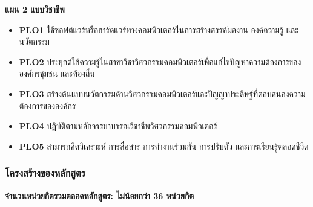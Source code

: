 \noindent\textbf{แผน 2 แบบวิชาชีพ}
\begin{itemize}
  \item \textbf{PLO1} ใช้ซอฟต์แวร์หรือฮาร์ดแวร์ทางคอมพิวเตอร์ในการสร้างสรรค์ผลงาน องค์ความรู้ และนวัตกรรม
  \item \textbf{PLO2} ประยุกต์ใช้ความรู้ในสาขาวิชาวิศวกรรมคอมพิวเตอร์เพื่อแก้ไขปัญหาความต้องการขององค์กรชุมชน และท้องถิ่น
  \item \textbf{PLO3} สร้างต้นแบบนวัตกรรมด้านวิศวกรรมคอมพิวเตอร์และปัญญาประดิษฐ์ที่ตอบสนองความต้องการขององค์กร
  \item \textbf{PLO4} ปฏิบัติตามหลักจรรยาบรรณวิชาชีพวิศวกรรมคอมพิวเตอร์
  \item \textbf{PLO5} สามารถคิดวิเคราะห์ การสื่อสาร การทำงานร่วมกัน การปรับตัว และการเรียนรู้ตลอดชีวิต
\end{itemize}

\subsubsection*{โครงสร้างของหลักสูตร}

\textbf{จำนวนหน่วยกิตรวมตลอดหลักสูตร: ไม่น้อยกว่า 36 หน่วยกิต}

